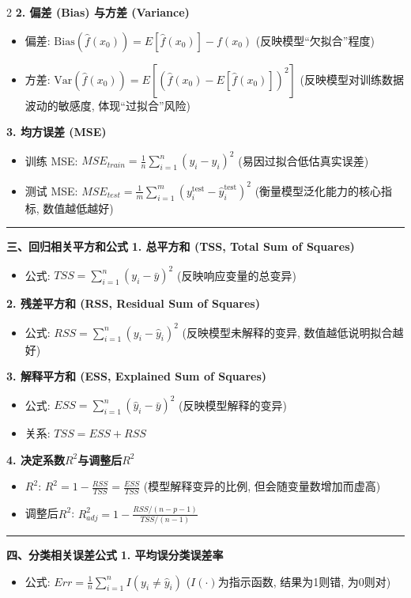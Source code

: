 \documentclass[9pt,a4paper]{article} %
\newcommand{\mysection}[1]{\vspace{0.5em}\hrule\vspace{0.3em}\noindent\textbf{\large #1}\vspace{0.1em}}
\begin{document}
\begin{multicols}{2}
\textbf{2. 偏差 (Bias) 与方差 (Variance)}
\begin{itemize}
    \item 偏差: $\text{Bias}(\hat{f}(x_0)) = E[\hat{f}(x_0)] - f(x_0)$ (反映模型“欠拟合”程度)
    \item 方差: $\text{Var}(\hat{f}(x_0)) = E[(\hat{f}(x_0) - E[\hat{f}(x_0)])^2]$ (反映模型对训练数据波动的敏感度, 体现“过拟合”风险)
\end{itemize}

\textbf{3. 均方误差 (MSE)}
\begin{itemize}
    \item 训练 MSE: $MSE_{train} = \frac{1}{n} \sum_{i=1}^{n} (y_i - \hat{y}_i)^2$ (易因过拟合低估真实误差)
    \item 测试 MSE: $MSE_{test} = \frac{1}{m} \sum_{i=1}^{m} (y_i^{\text{test}} - \hat{y}_i^{\text{test}})^2$ (衡量模型泛化能力的核心指标, 数值越低越好)
\end{itemize}

\mysection{三、回归相关平方和公式}
\textbf{1. 总平方和 (TSS, Total Sum of Squares)}
\begin{itemize}
    \item 公式: $TSS = \sum_{i=1}^{n} (y_i - \bar{y})^2$ (反映响应变量的总变异)
\end{itemize}

\textbf{2. 残差平方和 (RSS, Residual Sum of Squares)}
\begin{itemize}
    \item 公式: $RSS = \sum_{i=1}^{n} (y_i - \hat{y}_i)^2$ (反映模型未解释的变异, 数值越低说明拟合越好)
\end{itemize}

\textbf{3. 解释平方和 (ESS, Explained Sum of Squares)}
\begin{itemize}
    \item 公式: $ESS = \sum_{i=1}^{n} (\hat{y}_i - \bar{y})^2$ (反映模型解释的变异)
    \item 关系: $TSS = ESS + RSS$
\end{itemize}

\textbf{4. 决定系数$R^2$与调整后$R^2$}
\begin{itemize}
    \item $R^2$: $R^2 = 1 - \frac{RSS}{TSS} = \frac{ESS}{TSS}$ (模型解释变异的比例, 但会随变量数增加而虚高)
    \item 调整后$R^2$: $R_{adj}^2 = 1 - \frac{RSS/(n-p-1)}{TSS/(n-1)}$ 
    \end{itemize}

\mysection{四、分类相关误差公式}
\textbf{1. 平均误分类误差率}
\begin{itemize}
    \item 公式: $Err = \frac{1}{n} \sum_{i=1}^{n} I(y_i \neq \hat{y}_i)$ ($I(\cdot)$为指示函数, 结果为1则错, 为0则对)
\end{itemize}


\end{multicols}
\end{document}
